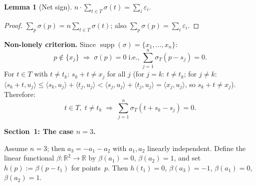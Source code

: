 \documentclass{article}
\newtheorem{lemma}{Lemma}
\begin{document}
\begin{lemma}[Net sign]\label{lem:netsign}
$n\cdot\sum_{t\in T}\sigma(t)=\sum_i\varepsilon_i$.
\end{lemma}
\begin{proof}
$\sum_p\sigma(p)=n\sum_{t\in T}\sigma(t)$; also $\sum_p\sigma(p)=\sum_i\varepsilon_i$.
\end{proof}

\noindent\textbf{Non-lonely criterion.}
Since $\operatorname{supp}(\sigma)=\{x_1,\dots,x_n\}$:
\begin{equation}\label{eq:nonlonely}
  p\notin\{x_j\}
  \;\Longrightarrow\;
  \sigma(p)=0
  \;\text{i.e.,}\;
  \sum_{j=1}^n\sigma_T(p-s_j)=0.
\end{equation}
For $t\in T$ with $t\ne t_k$: $s_k+t\ne x_j$ for all $j$ (for $j=k$: $t\ne t_k$;
for $j\ne k$: $\langle s_k+t,u_j\rangle\le\langle s_k,u_j\rangle+\langle t_j,u_j\rangle
<\langle s_j,u_j\rangle+\langle t_j,u_j\rangle=\langle x_j,u_j\rangle$,
so $s_k+t\ne x_j$).
Therefore:
\begin{equation}\label{eq:sigma0}
  t\in T,\;t\ne t_k
  \;\Longrightarrow\;
  \sum_{j=1}^n\sigma_T(t+s_k-s_j)=0.
\end{equation}

\bigskip
\noindent\textbf{Section~1: The case $n=3$.}

Assume $n=3$; then $a_3=-a_1-a_2$ with $a_1,a_2$ linearly independent.
Define the linear functional $\beta:\mathbb{R}^2\to\mathbb{R}$ by $\beta(a_1)=0$, $\beta(a_2)=1$,
and set $h(p):=\beta(p-t_1)$ for points~$p$.
Then $h(t_1)=0$, $\beta(a_3)=-1$, $\beta(a_1)=0$, $\beta(a_2)=1$.
\end{document}
